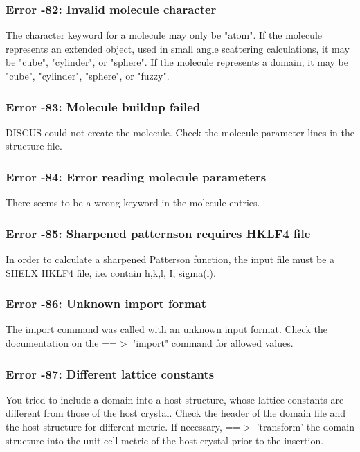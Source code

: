 \subsubsection{Error -82: Invalid molecule character}
\par
The character keyword for a molecule may only be "atom". 
If the molecule represents an extended object, used in small angle 
scattering calculations, it may be "cube", "cylinder", or 
"sphere". 
If the molecule represents a domain, it may be "cube", "cylinder", 
"sphere", or "fuzzy". 
\subsubsection{Error -83: Molecule buildup failed}
\par
DISCUS could not create the molecule. 
Check the molecule parameter lines in the structure file. 
\subsubsection{Error -84: Error reading molecule parameters}
\par
There seems to be a wrong keyword in the molecule entries. 
\subsubsection{Error -85: Sharpened patternson requires HKLF4 file}
\par
In order to calculate a sharpened Patterson function, the input file 
must be a SHELX HKLF4 file, i.e. contain h,k,l, I, sigma(i). 
\subsubsection{Error -86: Unknown import format}
\par
The import command was called with an unknown input format. Check the 
documentation on the ==$> $ 'import" command for allowed values. 
\subsubsection{Error -87: Different lattice constants}
\par
You tried to include a domain into a host structure, whose lattice 
constants are different from those of the host crystal. 
Check the header of the domain file and the host structure for 
different metric. 
If necessary, ==$> $ 'transform' the domain structure into the unit cell 
metric of the host crystal prior to the insertion. 
